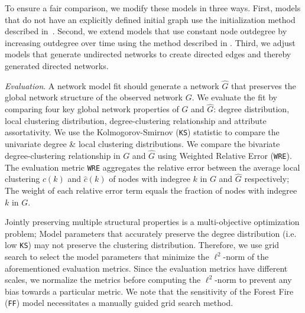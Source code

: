 To ensure a fair comparison, we modify these models in three ways. First,
models that do not have an explicitly defined initial graph use the
initialization method described in~. Second, we extend
models that use constant node outdegree by increasing outdegree over time
using the method described in . Third, we adjust models
that generate undirected networks to create directed edges and thereby
generated directed networks.

\textit{Evaluation}. A network model fit should generate a network $\hat{G}$ that
preserves the global network structure of the observed network $G$. We evaluate
the fit by comparing four key global network properties of ${G}$ and $\hat{G}$:
degree distribution, local clustering distribution, degree-clustering relationship
and attribute assortativity.
We use the Kolmogorov-Smirnov (\texttt{KS}) statistic to compare the univariate degree
\& local clustering distributions.
We compare the bivariate degree-clustering relationship in $G$ and $\hat{G}$ using
Weighted Relative Error (\texttt{WRE}). The evaluation metric \texttt{WRE} aggregates the relative error
between the average local clustering $c(k)$ and $\hat{c}(k)$ of nodes  with indegree $k$
in $G$ and $\hat{G}$ respectively; The weight of each relative error term equals the fraction
of nodes with indegree $k$ in $G$.

Jointly preserving multiple structural properties is a multi-objective optimization
problem; Model parameters that accurately preserve the degree distribution
(i.e. low \texttt{KS}) may not preserve the clustering distribution.
Therefore, we use grid search to select the model parameters that minimize the
$\ell^2$-norm of the aforementioned evaluation metrics. Since the evaluation metrics have
different scales, we normalize the metrics before computing the $\ell^2$-norm
to prevent any bias towards a particular metric.
We note that the sensitivity of the Forest Fire (\texttt{FF}) model necessitates a
manually guided grid search method.


